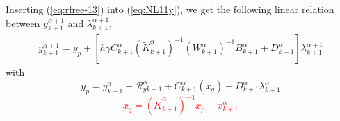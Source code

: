 Inserting (\ref{eq:rfree-13}) into (\ref{eq:NL11y}), we get the following linear relation between $y^{\alpha+1}_{k+1}$ and $\lambda^{\alpha+1}_{k+1}$, 
\begin{equation}
   \begin{array}{l}
 y^{\alpha+1}_{k+1} = y_p + \left[ h \gamma C^{\alpha}_{k+1} (\tilde K^{\alpha}_{k+1})^{-1}( W^{\alpha}_{k+1})^{-1}  B^{\alpha}_{k+1} + D^{\alpha}_{k+1} \right]\lambda^{\alpha+1}_{k+1}
   \end{array}
\end{equation}
with 
\begin{equation}\boxed{
y_p = y^{\alpha}_{k+1} -\mathcal R^{\alpha}_{yk+1} + C^{\alpha}_{k+1}(x_q) -
D^{\alpha}_{k+1} \lambda^{\alpha}_{k+1} }
\end{equation}
\textcolor{red}{
  \begin{equation}
   \boxed{ x_q=(\tilde K^{\alpha}_{k+1})^{-1}x_p -x^{\alpha}_{k+1}\label{eq:xqq}}
  \end{equation}
}











